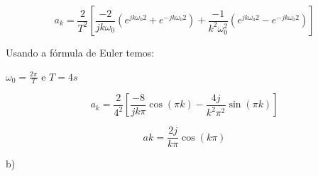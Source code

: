 \documentclass{article}
\begin{document}
\begin{equation}
    a_k = \frac{2}{T^2} \left [ \frac{-2}{jk\omega_0} \left ( e^{jk\omega_0 2} + e^{-jk\omega_0 2} \right ) + \frac{-1}{k^2 \omega_0 ^2} \left ( e^{jk\omega_0 2} - e^{-jk\omega_0 2} \right ) \right ]
\end{equation}

Usando a fórmula de Euler temos:

\begin{center}
    $\omega_0 = \frac{2\pi}{T}$ e $T = 4s$
\end{center}

\begin{equation}
    a_k = \frac{2}{4^2} \left [ \frac{-8}{jk\pi}\cos(\pi k) - \frac{4j}{k^2 \pi^2}\sin(\pi k) \right ]
\end{equation}

\begin{equation}
    ak = \frac{2j}{k \pi} \cos(k \pi)
\end{equation}

\break\vfill



b)
\end{document}
